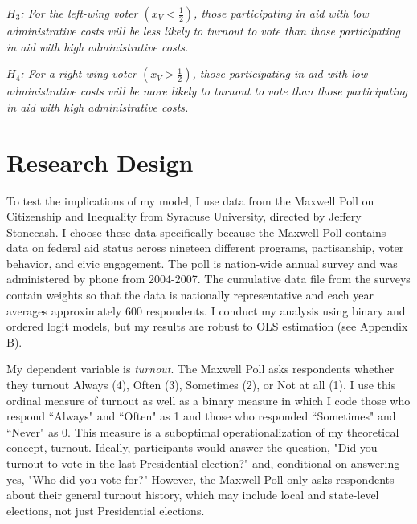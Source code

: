 \documentclass[12pt]{paper}
\begin{document}
\textit{$H_3$: For the left-wing voter $(x_V < \frac{1}{2})$, those participating in aid with low administrative costs will be less likely to turnout to vote than those participating in aid with high administrative costs.}

\textit{$H_4$: For a right-wing voter $(x_V > \frac{1}{2})$, those participating in aid with low administrative costs will be more likely to turnout to vote than those participating in aid with high administrative costs.}

\section{Research Design}
To test the implications of my model, I use data from the Maxwell Poll on Citizenship and Inequality from Syracuse University, directed by Jeffery Stonecash. I choose these data specifically because the Maxwell Poll contains data on federal aid status across nineteen different programs, partisanship, voter behavior, and civic engagement. The poll is nation-wide annual survey and was administered by phone from 2004-2007. The cumulative data file from the surveys contain weights so that the data is nationally representative and each year averages approximately 600 respondents. I conduct my analysis using binary and ordered logit models, but my results are robust to OLS estimation (see Appendix B). 

My dependent variable is \textit{turnout}. The Maxwell Poll asks respondents whether they turnout Always (4), Often (3), Sometimes (2), or Not at all (1). I use this ordinal measure of turnout as well as a binary measure in which I code those who respond ``Always" and ``Often" as 1 and those who responded ``Sometimes" and ``Never" as 0. This measure is a suboptimal operationalization of my theoretical concept, turnout. Ideally, participants would answer the question, "Did you turnout to vote in the last Presidential election?" and, conditional on answering yes, "Who did you vote for?" However, the Maxwell Poll only asks respondents about their general turnout history, which may include local and state-level elections, not just Presidential elections.
\end{document}

